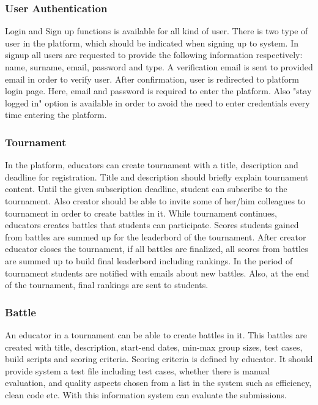 \subsubsection{User Authentication}
Login and Sign up functions is available for all kind of user. There is two type of user in the platform, which should be indicated when signing up to system. In signup all users are requested to provide the following information respectively:
name, surname, email, password and type. A verification email is sent to provided email in order to verify user. After confirmation, user is redirected to platform login page. Here, email and password is required to enter the platform. Also "stay logged in" option is available in order to avoid the need to enter credentials every time entering the platform.
\subsubsection{Tournament}
In the platform, educators can create tournament with a title, description and deadline for registration.  Title and description should briefly explain tournament content. Until the given subscription deadline, student can subscribe to the tournament. Also creator should be able to invite some of her/him colleagues to tournament in order to create battles in it. While tournament continues, educators creates battles that students can participate. Scores students gained from battles are summed up for the leaderbord of the tournament. After creator educator closes the tournament, if all battles are finalized, all scores from battles are summed up to build final leaderbord including rankings. In the period of tournament students are notified with emails about new battles. Also, at the end of the tournament, final rankings are sent to students.
\subsubsection{Battle}
An educator in a tournament can be able to create battles in it. This battles are created with title, description, start-end dates, min-max group sizes, test cases, build scripts and scoring criteria. Scoring criteria is defined by educator. It should provide system a test file including test cases, whether there is manual evaluation, and quality aspects chosen from a list in the system such as efficiency, clean code etc. With this information system can evaluate the submissions.

